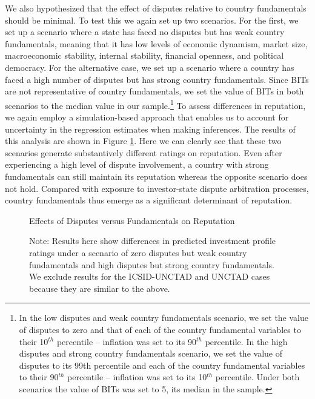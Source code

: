 \documentclass[12pt,onesided]{amsart}
\begin{document}
We also hypothesized that the effect of disputes relative to country fundamentals should be minimal. To test this we again set up two scenarios. For the first, we set up a scenario where a state has faced no disputes but has weak country fundamentals, meaning that it has low levels of economic dynamism, market size, macroeconomic stability, internal stability, financial openness, and political democracy. For the alternative case, we set up a scenario where a country has faced a high number of disputes but has strong country fundamentals. Since BITs are not representative of country fundamentals, we set the value of BITs in both scenarios to the median value in our sample.\footnote{In the low disputes and weak country fundamentals scenario, we set the value of disputes to zero and that of each of the country fundamental variables to their 10$^{th}$ percentile -- inflation was set to its 90$^{th}$ percentile. In the high disputes and strong country fundamentals scenario, we set the value of disputes to its 99th percentile and each of the country fundamental variables to their 90$^{th}$ percentile -- inflation was set to its 10$^{th}$ percentile. Under both scenarios the value of BITs was set to 5, its median in the sample.} To assess differences in reputation, we again employ a simulation-based approach that enables us to account for uncertainty in the regression estimates when making inferences. The results of this analysis are shown in Figure \ref{fig:dispFund}. Here we can clearly see that these two scenarios generate substantively different ratings on reputation. Even after experiencing a high level of dispute involvement, a country with strong fundamentals can still maintain its reputation whereas the opposite scenario does not hold. Compared with exposure to investor-state dispute arbitration processes, country fundamentals thus emerge as a significant determinant of reputation.


\begin{figure}[ht]
	\vspace{4cm}
	\centering
	\caption{Effects of Disputes versus Fundamentals on Reputation}
	\label{fig:dispFund}
	\resizebox{1\textwidth}{!}{}	
	\caption*{Note: Results here show differences in predicted investment profile ratings under a scenario of zero disputes but weak country fundamentals and high disputes but strong country fundamentals. We exclude results for the ICSID-UNCTAD and UNCTAD cases because they are similar to the above.}
\end{figure}
\end{document}
